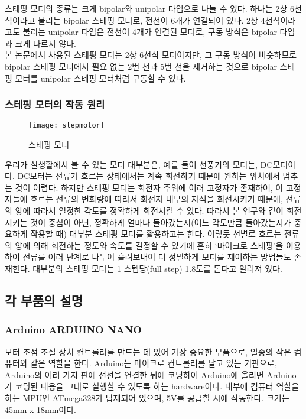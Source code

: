 스테핑 모터의 종류는 크게 bipolar와 unipolar 타입으로 나눌 수 있다. 하나는 2상 6선식이라고 불리는 bipolar 스테핑 모터로, 전선이 6개가 연결되어 있다. 2상 4선식이라고도 불리는 unipolar 타입은 전선이 4개가 연결된 모터로, 구동 방식은 bipolar 타입과 크게 다르지 않다.\\
본 논문에서 사용된 스테핑 모터는 2상 6선식 모터이지만, 그 구동 방식이 비슷하므로 bipolar 스테핑 모터에서 필요 없는 2번 선과 5번 선을 제거하는 것으로 bipolar 스테핑 모터를 unipolar 스테핑 모터처럼 구동할 수 있다.

\subsubsection{스테핑 모터의 작동 원리}

\begin{wrapfigure}{l}{0.5\textwidth}
	\texttt{[image: stepmotor]}
	\caption{스테핑 모터}
	\label{fig:stepmotor}
\end{wrapfigure}
우리가 실생활에서 볼 수 있는 모터 대부분은, 예를 들어 선풍기의 모터는, DC모터이다. DC모터는 전류가 흐르는 상태에서는 계속 회전하기 때문에 원하는 위치에서 멈추는 것이 어렵다. 하지만 스테핑 모터는 회전자 주위에 여러 고정자가 존재하여, 이 고정자들에 흐르는 전류의 변화량에 따라서 회전자 내부의 자석을 회전시키기 때문에, 전류의 양에 따라서 일정한 각도를 정확하게 회전시킬 수 있다. 따라서 본 연구와 같이 회전시키는 것이 중심이 아닌, 정확하게 얼마나 돌아갔는지(어느 각도만큼 돌아갔는지가 중요하게 작용할 때) 대부분 스테핑 모터를 활용하고는 한다. 이렇듯 선별로 흐르는 전류의 양에 의해 회전하는 정도와 속도를 결정할 수 있기에 흔히 ‘마이크로 스테핑’을 이용하여 전류를 여러 단계로 나누어 흘려보내어 더 정밀하게 모터를 제어하는 방법들도 존재한다. 대부분의 스테핑 모터는 1 스텝당(full step) 1.8도를 돈다고 알려져 있다.

\subsection{각 부품의 설명}

\subsubsection{Arduino ARDUINO NANO}

모터 초점 조절 장치 컨트롤러를 만드는 데 있어 가장 중요한 부품으로, 일종의 작은 컴퓨터와 같은 역할을 한다. Arduino는 마이크로 컨트롤러를 달고 있는 기판으로, Arduino의 여러 가지 핀에 전선을 연결한 뒤에 코딩하여 Arduino에 올리면 Arduino가 코딩된 내용을 그대로 실행할 수 있도록 하는 hardware이다. 내부에 컴퓨터 역할을 하는 MPU인 ATmega328가 탑재되어 있으며, 5V를 공급할 시에 작동한다. 크기는 45mm x 18mm이다.

